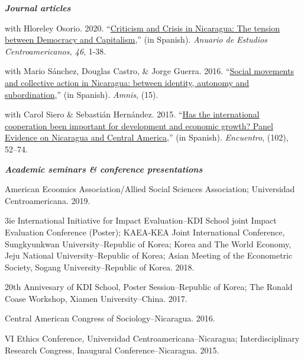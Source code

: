 \documentclass[11pt,article,oneside, a4paper]{memoir}
\begin{document}
\medskip
\noindent\emph{\textbf{Journal articles} \vspace{0.05in}}
 

\ind with Hloreley Osorio. 2020. ``\href{https://revistas.ucr.ac.cr/index.php/anuario/article/view/45081/44860}{Criticism and Crisis in Nicaragua: The tension between Democracy and Capitalism},'' (in Spanish). \emph{Anuario de Estudios Centroamericanos, 46}, 1-38.

\ind with Mario Sánchez, Douglas Castro, \& Jorge Guerra. 2016. ``\href{https://amnis.revues.org/2813}{Social movements and collective action in Nicaragua: between identity, autonomy and subordination},'' (in Spanish). \emph{Amnis}, (15).

\ind with Carol Siero \& Sebastián Hernández. 2015. ``\href{http://www.uca.edu.ni/2/images/Revista-Encuentro/Revistas/e102/art-5.pdf}{Has the international cooperation been important for development and economic growth? Panel Evidence on Nicaragua and Central America},'' (in Spanish). \emph{Encuentro}, (102), 52--74.


\medskip
\noindent\emph{\textbf{Academic seminars \& conference presentations} \vspace{0.05in}}

\ind American Ecoomics Association/Allied Social Sciences Association; Universidad Centroamericana. 2019.

\ind 3ie International Initiative for Impact Evaluation--KDI School joint Impact Evaluation Conference (Poster); KAEA-KEA Joint International Conference, Sungkyunkwan University–Republic of Korea; Korea and The World Economy, Jeju National
University–Republic of Korea; Asian Meeting of the Econometric Society, Sogang University–Republic
of Korea. 2018. 

\ind 20th Annivesary of KDI School, Poster Session–Republic of Korea; The Ronald Coase Workshop, Xiamen University–China. 2017. 

\ind Central American Congress of Sociology–Nicaragua. 2016. 

\ind VI Ethics Conference, Universidad Centroamericana–Nicaragua; Interdisciplinary Research Congress,
Inaugural Conference–Nicaragua. 2015. 
\end{document}
